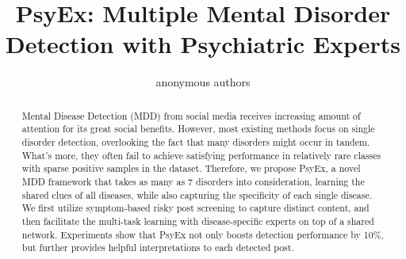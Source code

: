 \documentclass[11pt]{article}
\title{PsyEx: Multiple Mental Disorder Detection with Psychiatric Experts}
\author{anonymous authors}
\newcommand{\KZ}[1]{\textcolor{blue}{(Kenny: #1)}}
\newcommand{\MYW}[1]{\textcolor{green}{(Mengyue: #1)}}
\begin{document}
\maketitle
\begin{abstract}
Mental Disease Detection (MDD) from social media receives increasing amount of attention for its great social benefits.
However, most existing methods focus on single disorder detection, overlooking the fact that many disorders might occur in tandem. What's more, they often fail to achieve satisfying performance in relatively rare classes with sparse positive samples in the dataset.
Therefore, we propose PsyEx, a novel MDD framework that takes as many as 7 disorders into consideration, learning the shared clues of all diseases, while also capturing the specificity of each single disease. 
We first utilize symptom-based risky post screening to capture distinct content, and then facilitate the multi-task learning with disease-specific experts on top of a shared network. 
Experiments show that PsyEx not only boosts detection performance by 10\%, but further provides helpful interpretations to each detected post. %
\end{abstract}


% 





% 





\appendix


\end{document}
